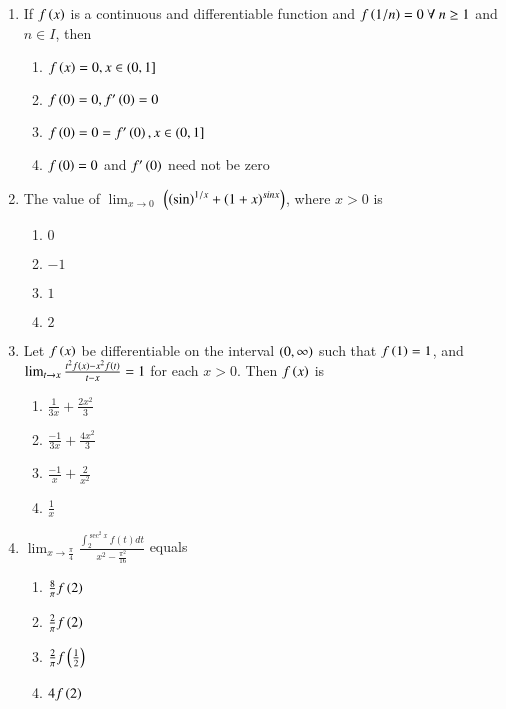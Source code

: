 \documentclass[journal,12pt,onecolumn]{IEEEtran}
\theoremstyle{remark}
\begin{document}
\begin{enumerate}
\item %

	If $f\left(x\right)$ is a continuous and differentiable function and $f\left(1/n\right)=0\ \forall\ n\geq1$ and$ n\in I$, then   \hfill{}
    \begin{enumerate}
	    \item $f\left(x\right)=0,x\in(0,1]$
	    \item $f\left(0\right)=0,f'\left(0\right)=0$
	    \item $f\left(0\right)=0=f'\left(0\right), x\in(0,1]$
	    \item $f\left(0\right)=0$ and $f'\left(0\right)$ need not be zero\\
    \end{enumerate}


\item %

	The value of $\lim_{x \to 0}$ $\left( \left(\sin\right)^{1/x} + \left(1+x\right)^{sinx}\right)$, where $x > 0$ is \hfill{}
    \begin{enumerate}
     \item $0$
     \item $-1$
     \item $1$
     \item $2$\\
    \end{enumerate}

\newpage
\item %

	Let $f\left(x\right)$ be differentiable on the interval $\left(0,\infty\right)$ such that $f\left(1\right)=1$, and $\lim_{t \to x} \frac{t^2f\left(x\right)-x^2f\left(t\right)}{t-x}=1$ for each $x>0$. Then $f\left(x\right)$ is \hfill{}
    \begin{enumerate}
     \item $\frac{1}{3x}+\frac{2x^2}{3}$\\
     \item $\frac{-1}{3x}+\frac{4x^2}{3}$\\
     \item $\frac{-1}{x}+\frac{2}{x^2}$\\
     \item $\frac{1}{x}$\\
    \end{enumerate}


\item %

	$\lim_{x \to \frac{\pi}{4}}$$ \frac{\int_2^{\sec^2 x} f(t) dt}{x^2-\frac{\pi^2}{16}}$ equals \hfill{}
    \begin{enumerate}
	    \item $\frac{8}{\pi}f\left(2\right)$
     \item $\frac{2}{\pi}f\left(2\right)$
     \item $\frac{2}{\pi}f\left(\frac{1}{2}\right)$
     \item $4f\left(2\right)$\\
    \end{enumerate}


\end{enumerate}
\end{document}

